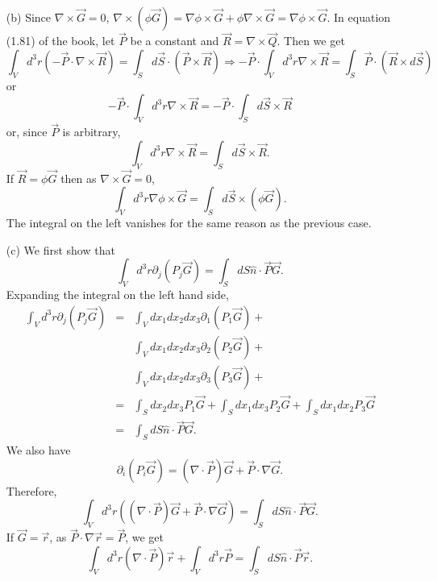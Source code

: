 \documentclass{article}
\begin{document}
\begin{enumerate}
\begin{enumerate}
\item[(b)] Since $\nabla\times\vec{G} = 0$, $\nabla\times(\phi\vec{G}) = 
\nabla\phi\times\vec{G} + \phi\nabla\times\vec{G} = \nabla\phi\times\vec{G}$. 
In equation (1.81) of the book, let $\vec{P}$ be a constant and $\vec{R} =
\nabla\times\vec{Q}$. Then we get
\[
\int_V d^3r (-\vec{P}\cdot\nabla\times\vec{R}) = 
\int_Sd\vec{S}\cdot(\vec{P} \times \vec{R}) \Rightarrow
-\vec{P}\cdot\int_V d^3r \nabla\times\vec{R} = 
\int_S\vec{P}\cdot(\vec{R}\times d\vec{S})
\]
or
\[
-\vec{P}\cdot\int_V d^3r \nabla\times\vec{R} = 
-\vec{P}\cdot\int_S d\vec{S} \times \vec{R}
\]
or, since $\vec{P}$ is arbitrary,
\begin{equation}\label{e2}
\int_V d^3r \nabla\times\vec{R} = \int_S d\vec{S} \times \vec{R}.
\end{equation}
If $\vec{R} = \phi\vec{G}$ then as $\nabla\times\vec{G} = 0$,
\[
\int_V d^3r\nabla\phi\times\vec{G} = \int_S d\vec{S} \times (\phi\vec{G}).
\]
The integral on the left vanishes for the same reason as the previous case.

\item[(c)] We first show that 
\begin{equation}\label{e3}
\int_V d^3r \partial_j(P_j\vec{G}) = \int_S dS\hat{n}\cdot\vec{P}\vec{G}.
\end{equation}
Expanding the integral on the left hand side,
\begin{eqnarray*}
\int_V d^3r \partial_j(P_j\vec{G}) &=& \int_V dx_1dx_2dx_3\partial_1(P_1\vec{G}) + \\
 & & \int_V dx_1dx_2dx_3\partial_2(P_2\vec{G}) + \\
 & & \int_V dx_1dx_2dx_3\partial_3(P_3\vec{G}) + \\
 &=& \int_Sdx_2dx_3 P_1\vec{G} + \int_Sdx_1dx_3 P_2\vec{G} + \int_Sdx_1dx_2 P_3\vec{G} \\
 &=& \int_S dS\hat{n}\cdot\vec{P}\vec{G}.
\end{eqnarray*}
We also have
\[
\partial_i(P_i\vec{G}) = (\nabla\cdot\vec{P})\vec{G} + \vec{P}\cdot\nabla\vec{G}.
\]
Therefore,
\[
\int_V d^3r \left((\nabla\cdot\vec{P})\vec{G} + \vec{P}\cdot\nabla\vec{G}\right) =
\int_S dS\hat{n}\cdot\vec{P}\vec{G}.
\]
If $\vec{G} = \vec{r}$, as $\vec{P}\cdot\nabla\vec{r} = \vec{P}$, we get
\[
\int_V d^3r (\nabla\cdot\vec{P})\vec{r} + \int_V d^3r \vec{P} =
\int_S dS\hat{n}\cdot\vec{P}\vec{r}.
\]
\end{enumerate}
\end{enumerate}
\end{document}
